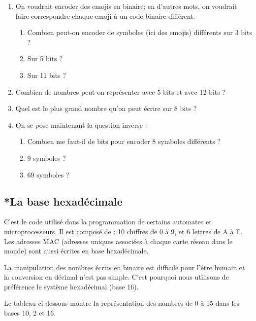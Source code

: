 \documentclass[11pt, a4paper]{book}
\begin{document}
\begin{exercice}
\begin{enumerate}
\item On voudrait encoder des emojis en binaire; en d'autres mots, on voudrait faire correspondre chaque emoji à un code binaire différent.
\begin{enumerate}
\item Combien peut-on encoder de symboles (ici des emojis) différents sur 3 bits ?
\item Sur 5 bits ?
\item Sur 11 bits ?
\end{enumerate}

\item Combien de nombres peut-on représenter avec 5 bits et avec 12 bits ?

\item Quel est le plus grand nombre qu'on peut écrire sur 8 bits ?


\vspace{10pt}
\item On se pose maintenant la question inverse : 
\begin{enumerate}
\item Combien me faut-il de bits pour encoder 8 symboles différents ?
\item 9 symboles ?
\item 69 symboles ?
\end{enumerate}

\end{enumerate}
\end{exercice}

\subsection{*La base hexadécimale}

C'est le code utilisé dans la programmation de certains automates et microprocesseurs. Il est composé de : 10 chiffres de 0 à 9, et 6 lettres de A à F. Les adresses MAC (adresses uniques associées à chaque carte réseau dans le monde) sont aussi écrites en base hexadécimale.

La manipulation des nombres écrits en binaire est difficile pour l'être humain et la conversion en décimal n'est pas simple. C'est pourquoi nous utilisons de préférence le système hexadécimal (base 16). 

Le tableau ci-dessous montre la représentation des nombres de 0 à 15 dans les bases 10, 2 et 16.
\end{document}
